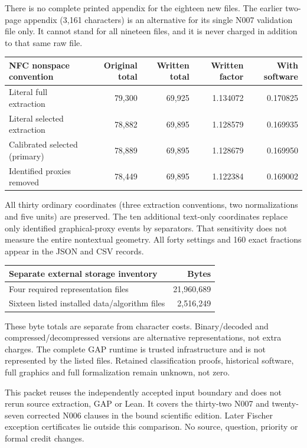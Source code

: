 \documentclass[11pt,a4paper]{article}
\begin{document}
There is no complete printed appendix for the eighteen new files. The earlier two-page appendix (3,161 characters) is an alternative for its single N007 validation file only. It cannot stand for all nineteen files, and it is never charged in addition to that same raw file.

\begin{center}\begin{tabular}{lrrrr}\toprule
NFC nonspace convention & Original total & Written total & Written factor & With software\\\midrule
Literal full extraction & 79,300 & 69,925 & 1.134072 & 0.170825\\
Literal selected extraction & 78,882 & 69,895 & 1.128579 & 0.169935\\
Calibrated selected (primary) & 78,889 & 69,895 & 1.128679 & 0.169950\\
Identified proxies removed & 78,449 & 69,895 & 1.122384 & 0.169002\\
\bottomrule\end{tabular}\end{center}
All thirty ordinary coordinates (three extraction conventions, two normalizations and five units) are preserved. The ten additional text-only coordinates replace only identified graphical-proxy events by separators. That sensitivity does not measure the entire nontextual geometry. All forty settings and 160 exact fractions appear in the JSON and CSV records.

\begin{center}\begin{tabular}{lr}\toprule
Separate external storage inventory & Bytes\\\midrule
Four required representation files &21,960,689\\
Sixteen listed installed data/algorithm files &2,516,249\\\bottomrule
\end{tabular}\end{center}
These byte totals are separate from character costs. Binary/decoded and compressed/decompressed versions are alternative representations, not extra charges. The complete GAP runtime is trusted infrastructure and is not represented by the listed files. Retained classification proofs, historical software, full graphics and full formalization remain unknown, not zero.

This packet reuses the independently accepted input boundary and does not rerun source extraction, GAP or Lean. It covers the thirty-two N007 and twenty-seven corrected N006 clauses in the bound scientific edition. Later Fischer exception certificates lie outside this comparison. No source, question, priority or formal credit changes.
\end{document}
